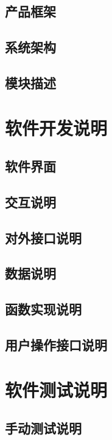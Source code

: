 \subsection{产品框架}

\subsection{系统架构}

\subsection{模块描述}

\newpage
\section{软件开发说明}

\subsection{软件界面}

\subsection{交互说明}

\subsection{对外接口说明}

\subsection{数据说明}

\subsection{函数实现说明}

\subsection{用户操作接口说明}

\newpage
\section{软件测试说明}

\subsection{手动测试说明}


